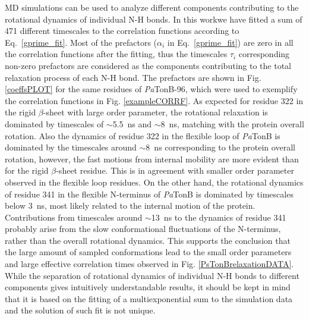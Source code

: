 \documentclass[journal=jpcbfk,manuscript=article]{achemso}
\providecommand{\DIFadd}[1]{{\protect\color{blue}\uwave{#1}}} %
\providecommand{\DIFaddbegin}{} %
\providecommand{\DIFaddend}{} %
\begin{document}
MD simulations can be used to analyze different components contributing to
the rotational dynamics of individual N-H bonds.
In this work\DIFaddbegin \DIFadd{, }\DIFaddend we have fitted a sum of 471 different
timescales to the correlation functions according to Eq.~\ref{gprime_fit}.
Most of the prefactors ($\alpha_i$ in Eq.~\ref{gprime_fit}) are zero
in all the correlation functions after the fitting,
thus the timescales $\tau_i$ corresponding non-zero prefactors
are considered as the components contributing to the total relaxation process of each N-H bond.
The prefactors are shown in Fig. \ref{coeffsPLOT} for the same residues
of {\it Pa}TonB-96, which were used to exemplify the correlation functions in Fig. \ref{exampleCORRF}.
As expected for residue 322 in the rigid $\beta$-sheet with large order parameter,
the rotational relaxation is dominated by timescales of $\sim$5.5~ns and $\sim$8~ns,
matching with the protein overall
rotation. Also the dynamics of residue 322 in the flexible loop of {\it Pa}TonB is
dominated by the timescales around $\sim$8~ns corresponding to the protein overall rotation,
however, the fast motions from internal mobility are more evident than for the
rigid $\beta$-sheet residue. This is in agreement with smaller order parameter observed
in the flexible loop residues. On the other hand, the rotational dynamics of
residue 341 in the flexible N-terminus of {\it Pa}TonB is dominated by timescales
below 3~ns, most likely related to the internal motion of the protein.
Contributions from timescales around $\sim$13~ns to the dynamics of residue 341 probably
arise from the slow conformational fluctuations of the N-terminus, rather than the overall
rotational dynamics. This supports the conclusion that the large amount of sampled
conformations lead to the small order parameters and large effective correlation times
observed in Fig. \ref{PsTonBrelaxationDATA}.
While the separation of rotational dynamics of individual N-H bonds to different components
gives intuitively understandable results, it should be kept in mind that
it is based on the fitting of a multiexponential sum to the simulation data and the solution
of such fit is not unique.
\end{document}
